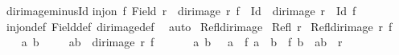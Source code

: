 \begin{isabellebody}
\isanewline
{}\isamarkupfalse%
\ dir{\isacharunderscore}{\kern0pt}image{\isacharunderscore}{\kern0pt}minus{\isacharunderscore}{\kern0pt}Id{\isacharcolon}{\kern0pt}\isanewline
{\isachardoublequoteopen}inj{\isacharunderscore}{\kern0pt}on\ f\ {\isacharparenleft}{\kern0pt}Field\ r{\isacharparenright}{\kern0pt}\ {\isasymLongrightarrow}\ {\isacharparenleft}{\kern0pt}dir{\isacharunderscore}{\kern0pt}image\ r\ f{\isacharparenright}{\kern0pt}\ {\isacharminus}{\kern0pt}\ Id\ {\isacharequal}{\kern0pt}\ dir{\isacharunderscore}{\kern0pt}image\ {\isacharparenleft}{\kern0pt}r\ {\isacharminus}{\kern0pt}\ Id{\isacharparenright}{\kern0pt}\ f{\isachardoublequoteclose}\isanewline
%
\isadelimproof
%
\endisadelimproof
%
\isatagproof
{}\isamarkupfalse%
\ inj{\isacharunderscore}{\kern0pt}on{\isacharunderscore}{\kern0pt}def\ Field{\isacharunderscore}{\kern0pt}def\ dir{\isacharunderscore}{\kern0pt}image{\isacharunderscore}{\kern0pt}def\ \isamarkupfalse%
\ auto%
\endisatagproof
{\isafoldproof}%
%
\isadelimproof
\isanewline
%
\endisadelimproof
\isanewline
{}\isamarkupfalse%
\ Refl{\isacharunderscore}{\kern0pt}dir{\isacharunderscore}{\kern0pt}image{\isacharcolon}{\kern0pt}\isanewline
{}\ {\isachardoublequoteopen}Refl\ r{\isachardoublequoteclose}\isanewline
{}\ {\isachardoublequoteopen}Refl{\isacharparenleft}{\kern0pt}dir{\isacharunderscore}{\kern0pt}image\ r\ f{\isacharparenright}{\kern0pt}{\isachardoublequoteclose}\isanewline
%
\isadelimproof
%
\endisadelimproof
%
\isatagproof
{}\isamarkupfalse%
{\isacharminus}{\kern0pt}\isanewline
\ \ \isacommand{{\isacharbraceleft}{\kern0pt}}\isamarkupfalse%
\isamarkupfalse%
\ a{\isacharprime}{\kern0pt}\ b{\isacharprime}{\kern0pt}\isanewline
\ \ \ \isamarkupfalse%
\ {\isachardoublequoteopen}{\isacharparenleft}{\kern0pt}a{\isacharprime}{\kern0pt}{\isacharcomma}{\kern0pt}b{\isacharprime}{\kern0pt}{\isacharparenright}{\kern0pt}\ {\isasymin}\ dir{\isacharunderscore}{\kern0pt}image\ r\ f{\isachardoublequoteclose}\isanewline
\ \ \ \isamarkupfalse%
\ \isamarkupfalse%
\ a\ b\ \ {}{\isacharcolon}{\kern0pt}\ {\isachardoublequoteopen}a{\isacharprime}{\kern0pt}\ {\isacharequal}{\kern0pt}\ f\ a\ {\isasymand}\ b{\isacharprime}{\kern0pt}\ {\isacharequal}{\kern0pt}\ f\ b\ {\isasymand}\ {\isacharparenleft}{\kern0pt}a{\isacharcomma}{\kern0pt}b{\isacharparenright}{\kern0pt}\ {\isasymin}\ r{\isachardoublequoteclose}\isanewline
\ \ \ \isamarkupfalse%

\end{isabellebody}
